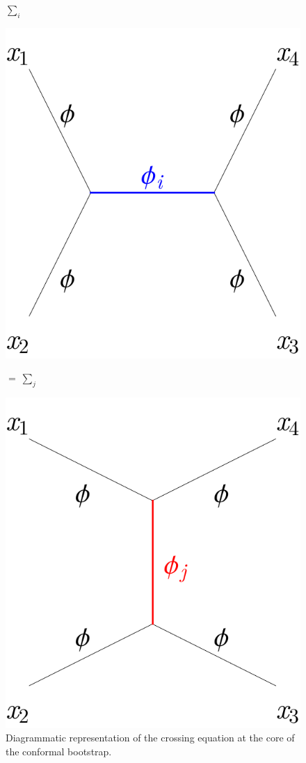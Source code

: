 \documentclass[a4paper,12pt]{article}
\numberwithin{equation}{section}
\begin{document}
\begin{figure}
	\centering
	\Large
	$\sum\limits_i$ \quad
	\parbox[c]{40mm}
	{\includegraphics[width=\linewidth]{figures/s-channel.pdf}}
	\quad $= ~ \sum\limits_j$  \quad
	\parbox[c]{40mm}
	{\includegraphics[width=\linewidth]{figures/t-channel.pdf}}
	\caption{Diagrammatic representation of the crossing
	equation at the core of the conformal bootstrap.}
	\label{fig:crossing}
\end{figure}
\end{document}
